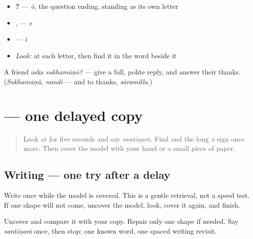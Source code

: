 \begin{itemize}
\raggedright
  \item \textbf{?} — \textbf{} \emph{ō}, the question ending, standing as its own letter
  \item \textbf{}, \textbf{} — \textbf{} \emph{e}
  \item \textbf{} — \textbf{} \emph{i}
\end{itemize}

\begin{itemize}
\raggedright
  \item \emph{Look:} at each letter, then find it in the word beside it
\end{itemize}

\begin{tcolorbox}[breakable,colback=teal!4,colframe=teal!35!black,title={Before you move on}]
A friend asks \emph{sukhamāṇō?} — give a full, polite reply, and answer their thanks. (\emph{Sukhamāṇŭ, nandi} — and to thanks, \emph{sāramilla}.)
\end{tcolorbox}
\section[\texorpdfstring{\ml{സന്തോഷം} (santōṣaṁ)}{സന്തോഷം (santōṣaṁ)}]{ — one delayed copy}

\label{lesson:ML-W03-santosham-delayed-copy}



\begin{quote}
Look at \textbf{} for five seconds and say \emph{santōṣaṁ}. Find \textbf{} and the long \emph{ō} sign \textbf{} once more. Then cover the model with your hand or a small piece of paper.
\end{quote}

\subsection*{Writing — one try after a delay}
Write \textbf{} once while the model is covered. This is a gentle retrieval, not a speed test. If one shape will not come, uncover the model, look, cover it again, and finish.

\begin{tcolorbox}[breakable,colback=teal!4,colframe=teal!35!black,title={Before you move on}]
Uncover \textbf{} and compare it with your copy. Repair only one shape if needed. Say \emph{santōṣaṁ} once, then stop: one known word, one spaced writing revisit.
\end{tcolorbox}
